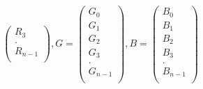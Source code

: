 \documentclass[a4paper,12pt]{article}
\begin{document}
\begin{compactitem}
\[\begin{pmatrix}
       R_3\\[0.3em]
		. \\[0.3em]
       R_{n-1}\\[0.3em]
\end{pmatrix}
, G=
\begin{pmatrix}
       G_0\\[0.3em]
       G_1\\[0.3em]
       G_2\\[0.3em]
       G_3\\[0.3em]
		. \\[0.3em]
       G_{n-1}\\[0.3em]
\end{pmatrix}
, B=
\begin{pmatrix}
       B_0\\[0.3em]
       B_1\\[0.3em]
       B_2\\[0.3em]
       B_3\\[0.3em]
		. \\[0.3em]
       B_{n-1}\\[0.3em]
\end{pmatrix}
\]


\end{compactitem}
\end{document}
